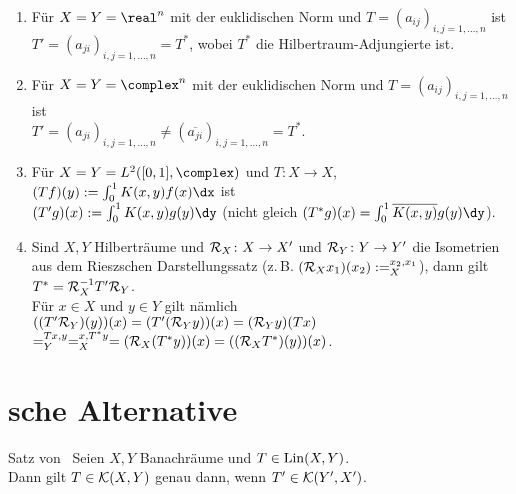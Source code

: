 \begin{Bsp}
    \begin{enumerate}[label=\emph{(\alph*)}]
        \item
        Für $X = Y = \real^n$ mit der euklidischen Norm und
        $T = (a_{ij})_{i,j=1,\dotsc,n}$ ist\\
        $T' = (a_{ji})_{i,j=1,\dotsc,n} = T^\ast$,
        wobei $T^\ast$ die Hilbertraum-Adjungierte ist.

        \item
        Für $X = Y = \complex^n$ mit der euklidischen Norm und
        $T = (a_{ij})_{i,j=1,\dotsc,n}$ ist\\
        $T' = (a_{ji})_{i,j=1,\dotsc,n} \not= (\overline{a_{ji}})_{i,j=1,\dotsc,n} = T^\ast$.

        \item
        Für $X = Y = L^2([0,1], \complex)$ und
        $T\colon X \rightarrow X$,
        $(Tf)(y) := \int_0^1 K(x, y)f(x)\dx$ ist\\
        $(T'g)(x) := \int_0^1 K(x, y)g(y)\dy$
        (nicht gleich
        $(T^\ast g)(x) = \int_0^1 \overline{K(x, y)} g(y) \dy$).

        \item
        Sind $X, Y$ Hilberträume und $\mathcal{R}_X\colon X \rightarrow X'$ und
        $\mathcal{R}_Y\colon Y \rightarrow Y'$ die Isometrien aus dem Rieszschen Darstellungssatz
        (z.\,B. $(\mathcal{R}_X x_1)(x_2) := \sp{x_2, x_1}_X$),
        dann gilt $T^\ast = \mathcal{R}_X^{-1} T' \mathcal{R}_Y$.\\
        Für $x \in X$ und $y \in Y$ gilt nämlich
        $((T' \mathcal{R}_Y)(y))(x)
        = (T'(\mathcal{R}_Y y))(x)
        = (\mathcal{R}_Y y)(Tx)$\\
        $= \sp{Tx, y}_Y
        = \sp{x, T^\ast y}_X
        = (\mathcal{R}_X (T^\ast y))(x)
        = ((\mathcal{R}_X T^\ast)(y))(x)$.
    \end{enumerate}
\end{Bsp}

\pagebreak

\section{%
    sche Alternative%
}

\begin{Satz}{Satz von \scshape\,\!}
    Seien $X, Y$ Banachräume und $T \in \operatorname{Lin}(X, Y)$.\\
    Dann gilt $T \in \mathcal{K}(X, Y)$ genau dann, wenn $T' \in \mathcal{K}(Y', X')$.
\end{Satz}

